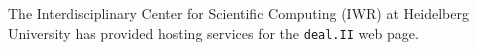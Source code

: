 \documentclass{ansarticle-preprint}
\newcommand{\specialword}[1]{\texttt{#1}}
\newcommand{\dealii}{{\specialword{deal.II}}}
\begin{document}
%
%
%

The Interdisciplinary Center for Scientific Computing (IWR) at Heidelberg University has provided
hosting services for the \dealii{} web page.


{}

\end{document}
